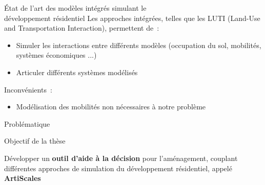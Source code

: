 \documentclass[xcolor=table]{beamer}
\begin{document}
\begin{frame}{État de l'art des modèles intégrés simulant le \\développement résidentiel}
Les approches intégrées, telles que les LUTI (Land-Use and Transportation Interaction), permettent de~:
\begin{itemize}
	\item Simuler les interactions entre différents modèles (occupation du sol, mobilités, systèmes économiques ...) 
	\item Articuler différents systèmes modélisés 
\end{itemize}
Inconvénients~:
\begin{itemize}
	\item Modélisation des mobilités non nécessaires à notre problème
\end{itemize}
\end{frame}

\begin{frame}{Problématique}
\end{frame}

\begin{frame}{Objectif de la thèse}
	\begin{block}{}
		Développer un \textbf{outil d'aide à la décision} pour l'aménagement, couplant différentes approches de simulation du développement résidentiel, appelé \textbf{ArtiScales}
	\end{block}
\end{frame}
\end{document}
